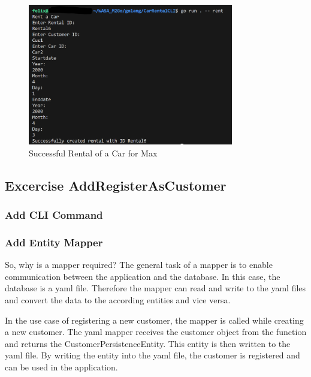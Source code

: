 \begin{figure}
      \centering
      \includegraphics[width=0.8\textwidth]{figures/goLang/carRental/carRentalCLI/carRentalCli_SuccessfulRentalMax.png}
      \caption{Successful Rental of a Car for Max}
      \label{fig:car_rental_cli_successful_rental_max}
\end{figure}

\subsection{Excercise AddRegisterAsCustomer}
\label{sec:exercise_add_register_as_customer}
\subsubsection*{Add CLI Command}

\subsubsection*{Add Entity Mapper}

So, why is a mapper required?
The general task of a mapper is to enable communication between the application and the database.
In this case, the database is a yaml file.
Therefore the mapper can read and write to the yaml files and convert the data to the according entities and vice versa.

In the use case of registering a new customer, the mapper is called while creating a new customer.
The yaml mapper receives the customer object from the function and returns the CustomerPersistenceEntity.
This entity is then written to the yaml file.
By writing the entity into the yaml file, the customer is registered and can be used in the application.

